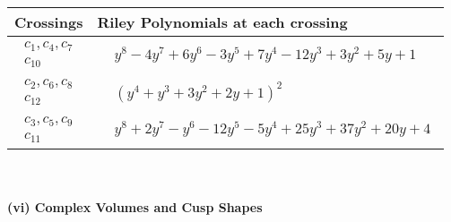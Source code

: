 \documentclass[1p]{elsarticle_modified}
\theoremstyle{definition}
\begin{document}
\begin{tabular}{m{50pt}|m{274pt}}
Crossings & \hspace{64pt}Riley Polynomials at each crossing \\
\hline $$\begin{aligned}c_{1},c_{4},c_{7}\\c_{10}\end{aligned}$$&$\begin{aligned}
&y^8-4 y^7+6 y^6-3 y^5+7 y^4-12 y^3+3 y^2+5 y+1
\end{aligned}$\\
\hline $$\begin{aligned}c_{2},c_{6},c_{8}\\c_{12}\end{aligned}$$&$\begin{aligned}
&(y^4+y^3+3 y^2+2 y+1)^2
\end{aligned}$\\
\hline $$\begin{aligned}c_{3},c_{5},c_{9}\\c_{11}\end{aligned}$$&$\begin{aligned}
&y^8+2 y^7- y^6-12 y^5-5 y^4+25 y^3+37 y^2+20 y+4
\end{aligned}$\\
\hline
\end{tabular}\\~\\
\newpage\flushleft \textbf{(vi) Complex Volumes and Cusp Shapes}
\end{document}
